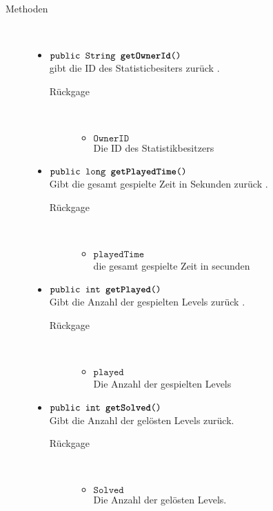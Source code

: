 \begin{description}
		\item[Methoden] \hfill \\
			\vspace{-.8cm}
			\begin{itemize}
			\item $\texttt{public  String \textbf{getOwnerId}()}$ \\ gibt die ID des Statisticbesiters zurück .
				\begin{description}
				\item[Rückgage] \hfill \\
					\vspace{-.8cm}
					\begin{itemize}
						\item $\texttt{OwnerID }$ \\Die ID des Statistikbesitzers 					
						\end{itemize}	
					\end{description}
				\item $\texttt{public  long \textbf{getPlayedTime}()}$ \\ Gibt die gesamt gespielte Zeit in Sekunden zurück .
				\begin{description}
				\item[Rückgage] \hfill \\
					\vspace{-.8cm}
					\begin{itemize}
						\item $\texttt{playedTime }$ \\die gesamt gespielte Zeit in secunden 
					\end{itemize}	
					\end{description}
					\item $\texttt{public  int \textbf{getPlayed}()}$ \\ Gibt die Anzahl der gespielten Levels zurück .
				\begin{description}
				\item[Rückgage] \hfill \\
					\vspace{-.8cm}
					\begin{itemize}
						\item $\texttt{played }$ \\ Die Anzahl der gespielten Levels
					\end{itemize}	
					\end{description}
					\item $\texttt{public  int \textbf{getSolved}()}$ \\ Gibt die Anzahl der gelösten Levels zurück.
				\begin{description}
				\item[Rückgage] \hfill \\
					\vspace{-.8cm}
					\begin{itemize}
						\item $\texttt{Solved }$ \\ Die Anzahl der gelösten Levels.
					\end{itemize}	
					\end{description}
			

\end{itemize}
\end{description}
